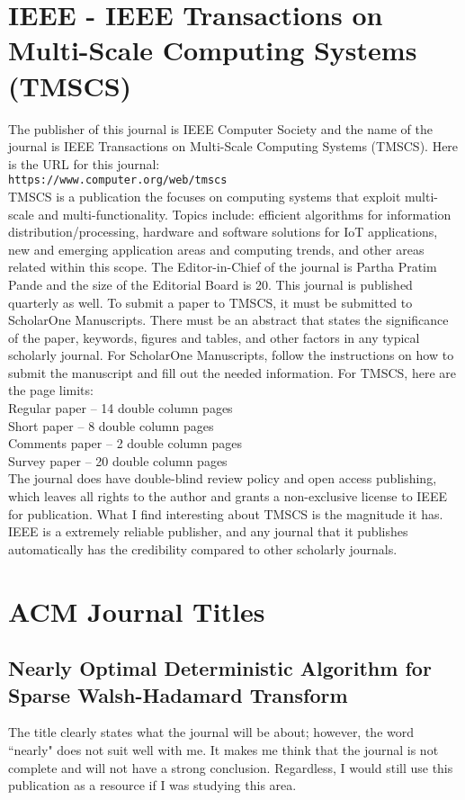 \documentclass[twocolumn]{article}
\begin{document}
\section{IEEE - IEEE Transactions on Multi-Scale Computing Systems (TMSCS)} 
The publisher of this journal is IEEE Computer Society and the name of the journal is IEEE Transactions on Multi-Scale Computing Systems (TMSCS). Here is the URL for this journal:
\\\texttt{https://www.computer.org/web/tmscs}
\\
TMSCS is a publication the focuses on computing systems that exploit multi-scale and multi-functionality. Topics include: efficient algorithms for information distribution/processing, hardware and software solutions for IoT applications, new and emerging application areas and computing trends, and other areas related within this scope.
The Editor-in-Chief of the journal is Partha Pratim Pande  and the size of the Editorial Board is 20.
This journal is published quarterly as well.
To submit a paper to TMSCS, it must be submitted to ScholarOne Manuscripts. There must be an abstract that states the significance of the paper, keywords, figures and tables, and other factors in any typical scholarly journal. For ScholarOne Manuscripts, follow the instructions on how to submit the manuscript and fill out the needed information.
For TMSCS, here are the page limits:
\\Regular paper – 14 double column pages 
\\Short paper – 8 double column pages
\\Comments paper – 2 double column pages
\\Survey paper – 20 double column pages
\\
The journal does have double-blind review policy and open access publishing, which leaves all rights to the author and grants a non-exclusive license to IEEE for publication.
What I find interesting about TMSCS is the magnitude it has. IEEE is a extremely reliable publisher, and any journal that it publishes automatically has the credibility compared to other scholarly journals.

\section{ACM Journal Titles}
\subsection{Nearly Optimal Deterministic Algorithm for Sparse Walsh-Hadamard Transform}
The title clearly states what the journal will be about; however, the word ``nearly" does not suit well with me. It makes me think that the journal is not complete and will not have a strong conclusion. Regardless, I would still use this publication as a resource if I was studying this area.
\end{document}
